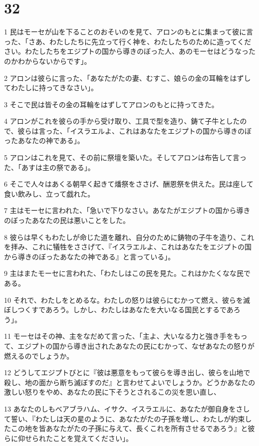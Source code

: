 \chapter{32}

\par 1 民はモーセが山を下ることのおそいのを見て、アロンのもとに集まって彼に言った、「さあ、わたしたちに先立って行く神を、わたしたちのために造ってください。わたしたちをエジプトの国から導きのぼった人、あのモーセはどうなったのかわからないからです」。
\par 2 アロンは彼らに言った、「あなたがたの妻、むすこ、娘らの金の耳輪をはずしてわたしに持ってきなさい」。
\par 3 そこで民は皆その金の耳輪をはずしてアロンのもとに持ってきた。
\par 4 アロンがこれを彼らの手から受け取り、工具で型を造り、鋳て子牛としたので、彼らは言った、「イスラエルよ、これはあなたをエジプトの国から導きのぼったあなたの神である」。
\par 5 アロンはこれを見て、その前に祭壇を築いた。そしてアロンは布告して言った、「あすは主の祭である」。
\par 6 そこで人々はあくる朝早く起きて燔祭をささげ、酬恩祭を供えた。民は座して食い飲みし、立って戯れた。
\par 7 主はモーセに言われた、「急いで下りなさい。あなたがエジプトの国から導きのぼったあなたの民は悪いことをした。
\par 8 彼らは早くもわたしが命じた道を離れ、自分のために鋳物の子牛を造り、これを拝み、これに犠牲をささげて、『イスラエルよ、これはあなたをエジプトの国から導きのぼったあなたの神である』と言っている」。
\par 9 主はまたモーセに言われた、「わたしはこの民を見た。これはかたくなな民である。
\par 10 それで、わたしをとめるな。わたしの怒りは彼らにむかって燃え、彼らを滅ぼしつくすであろう。しかし、わたしはあなたを大いなる国民とするであろう」。
\par 11 モーセはその神、主をなだめて言った、「主よ、大いなる力と強き手をもって、エジプトの国から導き出されたあなたの民にむかって、なぜあなたの怒りが燃えるのでしょうか。
\par 12 どうしてエジプトびとに『彼は悪意をもって彼らを導き出し、彼らを山地で殺し、地の面から断ち滅ぼすのだ』と言わせてよいでしょうか。どうかあなたの激しい怒りをやめ、あなたの民に下そうとされるこの災を思い直し、
\par 13 あなたのしもべアブラハム、イサク、イスラエルに、あなたが御自身をさして誓い、『わたしは天の星のように、あなたがたの子孫を増し、わたしが約束したこの地を皆あなたがたの子孫に与えて、長くこれを所有させるであろう』と彼らに仰せられたことを覚えてください」。
